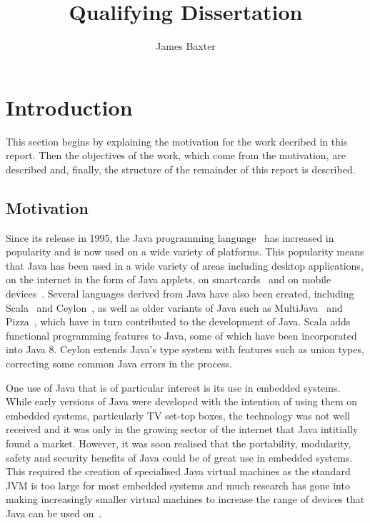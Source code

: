 \documentclass[a4paper,10pt]{article}
\title{Qualifying Dissertation}
\author{James Baxter}
\date{}
\begin{document}
\maketitle

\section{Introduction}

This section begins by explaining the motivation for the work decribed in
this report. Then the objectives of the work, which come from the motivation,
are described and, finally, the structure of the remainder of this report is
described.

\subsection{Motivation}

Since its release in 1995, the Java programming language~\cite{gosling2013} has
increased in popularity and is now used on a wide variety of platforms.  This
popularity means that Java has been used in a wide variety of areas including
desktop applications, on the internet in the form of Java applets, on
smartcards~\cite{chen2000} and on mobile devices~\cite{oracle2014}.  Several
languages derived from Java have also been created, including
Scala~\cite{lausanne2015} and Ceylon~\cite{redhat2015}, as well as older
variants of Java such as MultiJava~\cite{clifton2006} and
Pizza~\cite{odersky1997}, which have in turn contributed to the development of
Java. Scala adds functional programming features to Java, some of which have
been incorporated into Java 8. Ceylon extends Java's type system with features
such as union types, correcting some common Java errors in the process.

One use of Java that is of particular interest is its use in embedded systems.
While early versions of Java were developed with the intention of using them on
embedded systems, particularly TV set-top boxes, the technology was not well
received and it was only in the growing sector of the internet that Java
intitially found a market. %
However, it was soon realised that the portability, modularity, safety and
security benefits of Java could be of great use in embedded
systems. %
This required the creation of specialised Java virtual machines as the standard
JVM is too large for most embedded systems and much research has gone into
making increasingly smaller virtual machines to increase the range of devices
that Java can be used on~\cite{caska2011,thomm2010}.
\end{document}
